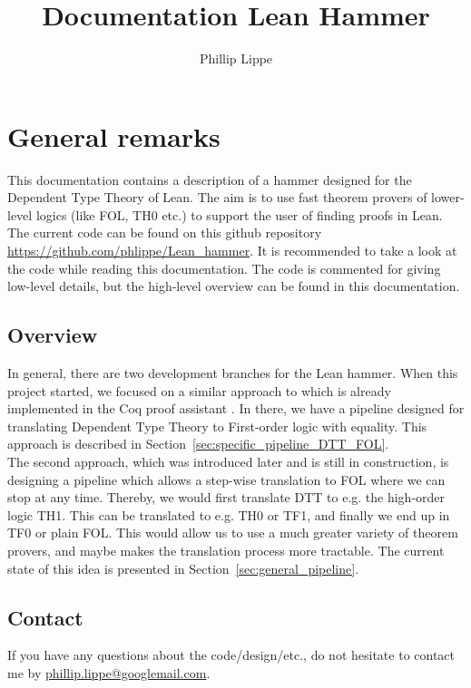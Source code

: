 \documentclass[a4paper]{article}
\title{Documentation Lean Hammer}
\author{Phillip Lippe}
\begin{document}
\maketitle
\tableofcontents
\newpage

\section*{General remarks}
This documentation contains a description of a hammer designed for the Dependent Type Theory of Lean. The aim is to use fast theorem provers of lower-level logics (like FOL, TH0 etc.) to support the user of finding proofs in Lean. \\

The current code can be found on this github repository \href{https://github.com/phlippe/Lean_hammer}{https://github.com/phlippe/Lean\_hammer}. It is recommended to take a look at the code while reading this documentation. The code is commented for giving low-level details, but the high-level overview can be found in this documentation.\\

\subsection*{Overview}

In general, there are two development branches for the Lean hammer. When this project started, we focused on a similar approach to which is already implemented in the Coq proof assistant \cite{CoqHammer}. In there, we have a pipeline designed for translating Dependent Type Theory to First-order logic with equality. This approach is described in Section~\ref{sec:specific_pipeline_DTT_FOL}.\\
The second approach, which was introduced later and is still in construction, is designing a pipeline which allows a step-wise translation to FOL where we can stop at any time. Thereby, we would first translate DTT to e.g. the high-order logic TH1. This can be translated to e.g. TH0 or TF1, and finally we end up in TF0 or plain FOL. This would allow us to use a much greater variety of theorem provers, and maybe makes the translation process more tractable. The current state of this idea is presented in Section~\ref{sec:general_pipeline}. 

\subsection*{Contact}
If you have any questions about the code/design/etc., do not hesitate to contact me by \href{mailto:phillip.lippe@googlemail.com}{phillip.lippe@googlemail.com}.
\end{document}

